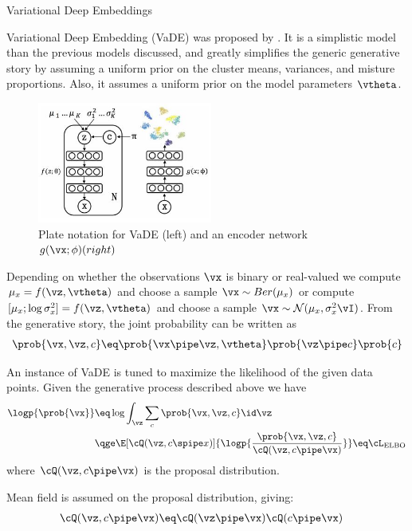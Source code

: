 \documentclass{article}
\begin{document}
\begin{psection}{Variational Deep Embeddings}

	Variational Deep Embedding (VaDE) was proposed by \cite{vade}. It is a simplistic model than the previous models discussed, and greatly simplifies the generic generative story by assuming a uniform prior on the cluster means, variances, and misture proportions. Also, it assumes a uniform prior on the model parameters $\vtheta$.

	\begin{figure}[h]
		\centering
		\includegraphics[height=150px]{includes/vade.jpg}
		\caption{Plate notation for VaDE (left) and an encoder network $g(\vx; \phi) (right)$}
		\label{fig:my_label}
	\end{figure}

	Depending on whether the observations $\vx$ is binary or real-valued we compute $\mu_x = f(\vz, \vtheta)$ and choose a sample $\vx \sim Ber(\mu_x)$ or compute $[\mu_x;\log\sigma^2_x] = f(\vz,\vtheta)$ and choose a sample $\vx \sim \mathcal{N}(\mu_x,\sigma^2_x\vI)$. From the generative story, the joint probability can be written as
	\begin{align*}
		\prob{\vx, \vz, c} \eq \prob{\vx \pipe \vz, \vtheta} \prob{\vz \pipe c} \prob{c}
	\end{align*}

	An instance of VaDE is tuned to maximize the likelihood of the given data points. Given the generative process described above we have
	\begin{align*}
		\logp{\prob{\vx}} &\eq \log{\int_\vz \sum_c \prob{\vx, \vz, c} \id \vz} \\
		&\qge \E[\cQ(\vz, c \spipe x)]{\logp{\frac{\prob{\vx, \vz, c}}{\cQ(\vz, c \pipe \vx)}}} \eq \cL_{\text{ELBO}}
	\end{align*}
	where $\cQ(\vz, c \pipe \vx)$ is the proposal distribution.

	Mean field is assumed on the proposal distribution, giving:
	\begin{align*}
		\cQ(\vz, c \pipe \vx) &\eq \cQ(\vz \pipe \vx) \cQ(c \pipe \vx)
	\end{align*}


\end{psection}
\end{document}

